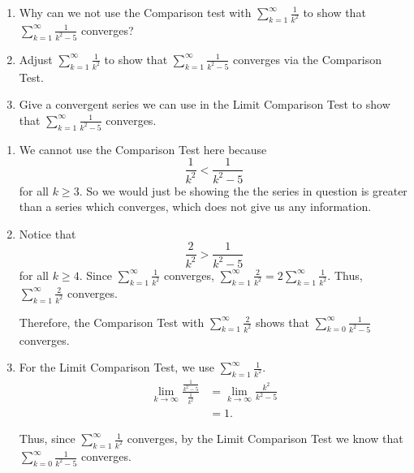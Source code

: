 \documentclass[]{ximera}
\begin{document}
\begin{problem}
	\begin{enumerate}
	
	\item  Why can we not use the Comparison test with $\sum_{k=1}^\infty \frac{1}{k^2}$ to show that $\sum_{k=1}^\infty \frac{1}{k^2 - 5}$ converges?
	
	\item  Adjust $\sum_{k=1}^\infty \frac{1}{k^2}$ to show that $\sum_{k=1}^\infty \frac{1}{k^2 - 5}$ converges via the Comparison Test.
	
	\item  Give a convergent series we can use in the Limit Comparison Test to show that $\sum_{k=1}^\infty \frac{1}{k^2 - 5}$ converges.  
	
	\end{enumerate}
	
	\begin{freeResponse}
		\begin{enumerate}
		\item  We cannot use the Comparison Test here because 
			\[
			\frac{1}{k^2} < \frac{1}{k^2 - 5}
			\]
		for all $k \geq 3$.  
		So we would just be showing the the series in question is greater than a series which converges, which does not give us any information.
		
		
		
		\item  Notice that
			\[
			\frac{2}{k^2} > \frac{1}{k^2 - 5}
			\]
		for all $k \geq 4$.  
		Since $\sum_{k=1}^\infty \frac{1}{k^2}$ converges, $\sum_{k=1}^\infty \frac{2}{k^2} = 2 \sum_{k=1}^\infty \frac{1}{k^2}$.  
		Thus, $\sum_{k=1}^\infty \frac{2}{k^2}$ converges.
		
		Therefore, the Comparison Test with $\sum_{k=1}^\infty \frac{2}{k^2}$ shows that $\sum_{k=0}^\infty \frac{1}{k^2-5}$ converges.
		
		
		
		\item  For the Limit Comparison Test, we  use $\sum_{k=1}^\infty \frac{1}{k^2}$.  
			\begin{align*}
			\lim_{k \to \infty} \frac{\frac{1}{k^2-5}}{\frac{1}{k^2}}
			&= \lim_{k \to \infty} \frac{k^2}{k^2-5}  \\
			&= 1.
			\end{align*}
			
		Thus, since $\sum_{k=1}^\infty \frac{1}{k^2}$ converges, by the Limit Comparison Test we know that $\sum_{k=0}^\infty \frac{1}{k^2-5}$ converges.
		
		\end{enumerate}
	\end{freeResponse}

\end{problem}
\end{document}
